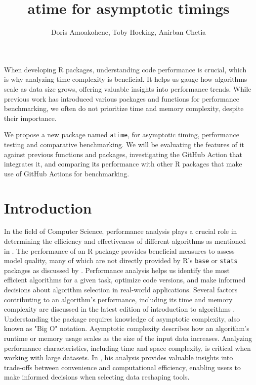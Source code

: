 \title{atime for asymptotic timings }
\author{Doris Amoakohene, Toby Hocking, Anirban Chetia}

\maketitle

\abstract{}
When developing R packages, understanding code performance is crucial, which is why analyzing time complexity is beneficial. It helps us gauge how algorithms scale as data size grows, offering valuable insights into performance trends. While previous work has introduced various packages and functions for performance benchmarking, we often do not prioritize time and memory complexity, despite their importance.

We propose a new package named \texttt{atime}, for asymptotic timing, performance testing and comparative benchmarking. We will be evaluating the features of it against previous functions and packages, investigating the GitHub Action that integrates it, and comparing its performance with other R packages that make use of GitHub Actions for benchmarking. 

\section{Introduction}
 In the field of Computer Science, performance analysis plays a crucial role in determining the efficiency and effectiveness of different algorithms as mentioned in \cite{knuth1997art}. The performance of an R package provides beneficial measures to assess model quality, many of which are not directly provided by R's \texttt{base} or \texttt{stats} packages as discussed by \cite{RcoreTeam}. Performance analysis helps us identify the most efficient algorithms for a given task, optimize code versions, and make informed decisions about algorithm selection in real-world applications. Several factors contributing to an algorithm's performance, including its time and memory complexity are discussed in the latest edition of introduction to algorithms \cite{cormen2022introduction}.\\

\noindent Understanding the  package requires knowledge of asymptotic complexity, also known as "Big O" notation. Asymptotic complexity describes how an algorithm's runtime or memory usage scales as the size of the input data increases. Analyzing performance characteristics, including time and space complexity, is critical when working with large datasets. In \cite{Hocking2021}, his analysis provides valuable insights into trade-offs between convenience and computational efficiency, enabling users to make informed decisions when selecting data reshaping tools.
 
